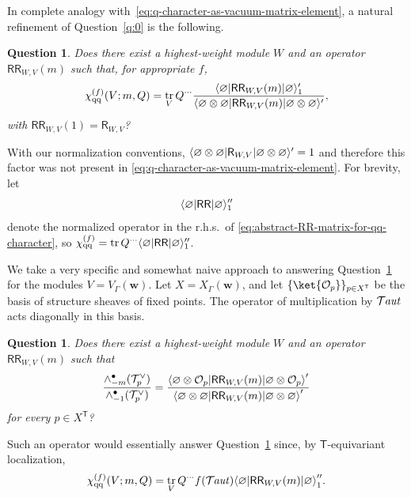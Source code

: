 \documentclass[pdftex]{sigma}%
\numberwithin{equation}{section}
\newtheorem{question}[Theorem]{Question}
\renewcommand{\vec}[1]{\bm{#1}}
\newcommand{\cO}{\mathcal{O}}
\newcommand{\cT}{\mathcal{T}}
\newcommand{\kQ}{Q}
\newcommand{\sT}{\mathsf{T}}
\newcommand{\sR}{\mathsf{R}}
\newcommand{\sRR}{\mathsf{RR}}
\newcommand{\chiqq}{\chi_{\mathrm{qq}}}
\DeclareMathOperator{\Taut}{\mathcal{T}\mkern-1.5mu{\mathit{aut}}}
\DeclareMathOperator{\tr}{tr}
\DeclarePairedDelimiter{\inner}{\langle}{\rangle}
\begin{document}
\begin{MyParagraph}
In complete analogy with~\eqref{eq:q-character-as-vacuum-matrix-element}, a natural refinement
of Question~\ref{q:0} is the following.

\begin{question}\label{q:1}
 Does there exist a highest-weight module $W$ and an operator
 $\sRR_{W,V}(m)$ such that, for appropriate $f$,
 \begin{equation} \label{eq:abstract-RR-matrix-for-qq-character}
 \chiqq^{(f)}(V; m, \kQ) = \tr_V \kQ^{\cdots} \frac{\inner{\varnothing | \sRR_{W,V}(m) | \varnothing}_1'}{\inner{\varnothing \otimes \varnothing | \sRR_{W,V}(m) | \varnothing \otimes \varnothing}'},
 \end{equation}
 with $\sRR_{W,V}(1) = \sR_{W,V}$?
\end{question}

With our normalization conventions,
$\inner{\varnothing \otimes \varnothing | \sR_{W,V} | \varnothing \otimes \varnothing}' = 1$
and therefore this factor was not present in
\eqref{eq:q-character-as-vacuum-matrix-element}. For brevity, let
\[ \inner{\varnothing | \sRR | \varnothing}_1'' \]
denote the normalized operator in the r.h.s.\ of
\eqref{eq:abstract-RR-matrix-for-qq-character}, so
$\chiqq^{(f)} = \tr \kQ^{\cdots} \inner{\varnothing | \sRR | \varnothing}_1''$.
\end{MyParagraph}

\begin{MyParagraph}
We take a very specific and somewhat naive approach to answering
Question~\ref{q:1} for the modules $V = V_\Gamma(\vec w)$. Let
$X = X_\Gamma(\vec w)$, and let $\{\ket{\cO_p}\}_{p \in X^\sT}$ be the
basis of structure sheaves of fixed points. The operator of
multiplication by $\Taut$ acts diagonally in this basis.

\begin{question}\label{q:2}
 Does there exist a highest-weight module $W$ and an operator
 $\sRR_{W,V}(m)$ such that
 \[ \frac{\wedge_{-m}^\bullet(\cT_p^\vee)}{\wedge_{-1}^\bullet(\cT_p^\vee)} = \frac{\inner*{\varnothing \otimes \cO_p | \sRR_{W,V}(m) | \varnothing \otimes \cO_p}'}{\inner*{\varnothing \otimes \varnothing | \sRR_{W,V}(m) | \varnothing \otimes \varnothing}'} \]
 for every $p \in X^{\sT}$?
\end{question}

Such an operator would essentially answer Question~\ref{q:1} since, by
$\sT$-equivariant localization,
\begin{equation} \label{eq:qq-character-in-fixed-point-basis}
 \chiqq^{(f)}(V; m, \kQ) = \tr_V \kQ^{\cdots} f(\Taut) \inner*{\varnothing | \sRR_{W,V}(m) | \varnothing}_1''.
\end{equation}
\end{MyParagraph}
\end{document}
